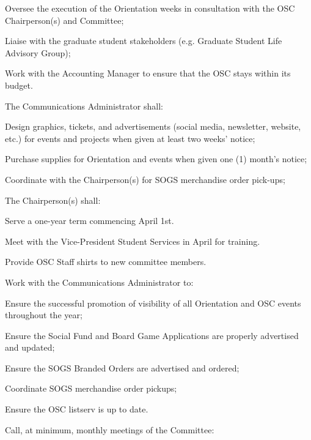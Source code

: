 \begin{longenum}[ label*=\thesubsection.\arabic*., align=left]
\begin{longenum}[label*=\arabic*., align=left]
\begin{longenum}[label*=\arabic*., align=left]
			\item Oversee the execution of the Orientation weeks in consultation with the OSC Chairperson(s) and Committee;			
			\item Liaise with the graduate student stakeholders (e.g. Graduate Student Life Advisory Group);
			\item Work with the Accounting Manager to ensure that the OSC stays within its budget.
			\end{longenum}
		\item The Communications Administrator shall:		
			\begin{longenum}[label*=\arabic*., align=left]
			\item Design graphics, tickets, and advertisements (social media, newsletter, website, etc.) for events and projects when given at least two weeks' notice;
			\item Purchase supplies for Orientation and events when given one (1) month's notice;
			\item Coordinate with the Chairperson(s) for SOGS merchandise order pick-ups;
			\end{longenum}			
		\item The Chairperson(s) shall:
			\begin{longenum}[label*=\arabic*., align=left]
			\item Serve a one-year term commencing April 1st.
			\item Meet with the Vice-President Student Services in April for training.
			\item Provide OSC Staff shirts to new committee members.
			\item Work with the Communications Administrator to:
				\begin{longenum}[label*=\arabic*., align=left]			
				\item Ensure the successful promotion of visibility of all Orientation and OSC events throughout the year;
				\item Ensure the Social Fund and Board Game Applications are properly advertised and updated;
				\item Ensure the SOGS Branded Orders are advertised and ordered;
				\item Coordinate SOGS merchandise order pickups;
				\item Ensure the OSC listserv is up to date.											
				\end{longenum}				
			\item Call, at minimum, monthly meetings of the Committee:
				\begin{longenum}[label*=\arabic*., align=left]

\end{longenum}
\end{longenum}
\end{longenum}
\end{longenum}
